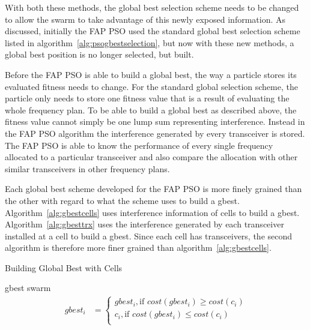 With both these methods, the global best selection scheme needs to be changed to allow the swarm to take advantage of this newly exposed information. As discussed, initially the \gls{FAP} \gls{PSO} used the standard global best selection scheme listed in algorithm~\ref{alg:psogbestselection}, but now with these new methods, a global best position is no longer selected, but built.

Before the \gls{FAP} \gls{PSO} is able to build a global best, the way a particle stores its evaluated fitness needs to change. For the standard global selection scheme, the particle only needs to store one fitness value that is a result of evaluating the whole frequency plan. To be able to build a global best as described above, the fitness value cannot simply be one lump sum representing interference. Instead in the \gls{FAP} \gls{PSO} algorithm the interference generated by every transceiver is stored. The \gls{FAP} \gls{PSO} is able to know the performance of every single frequency allocated to a particular transceiver and also compare the allocation with other similar transceivers in other frequency plans.

Each global best scheme developed for the \gls{FAP} \gls{PSO} is more finely grained than the other with regard to what the scheme uses to build a gbest. Algorithm~\ref{alg:gbestcells} uses interference information of cells to build a gbest. Algorithm~\ref{alg:gbesttrx} uses the interference generated by each transceiver installed at a cell to build a gbest. Since each cell has transceivers, the second algorithm is therefore more finer grained than algorithm~\ref{alg:gbestcells}.

\begin{algorithm}[H]
\caption{Building Global Best with Cells}
\label{alg:gbestcells}
\begin{algorithmic}[1]
\Require gbest
\Require swarm
\begin{align}
gbest_{i}&=
    \begin{cases}
        gbest_{i} , \text{if $cost(gbest_{i}) \ge cost(c_{i})$}\\
        c_{i}, \text{if $cost(gbest_{i}) \leq cost(c_{i})$}\\
    \end{cases}
\end{align}
\EndFor
\end{algorithmic}
\end{algorithm}

